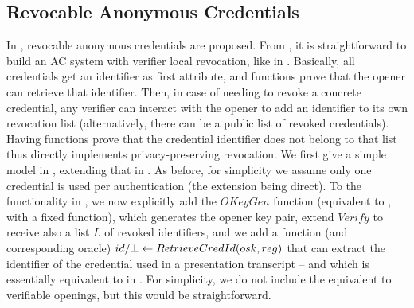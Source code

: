 \subsection{Revocable Anonymous Credentials}
\label{sapp:related-models-rac}

In \cite{cks10}, revocable anonymous credentials are proposed. From \CUASGen, it
is straightforward to build an AC system with verifier local revocation, like in
\cite{bs04}. Basically, all credentials get an identifier as first attribute,
and \feval functions prove that the opener can retrieve that identifier. Then,
in case of needing to revoke a concrete credential, any verifier can interact
with the opener to add an identifier to its own revocation list (alternatively,
there can be a public list of revoked credentials). Having \feval functions
prove that the credential identifier does not belong to that list thus directly
implements privacy-preserving revocation. We first give a simple model in
, extending that in . As
before, for simplicity we assume only one credential is used per authentication
(the extension being direct). To the functionality in
, we now explicitly add the $OKeyGen$ function
(equivalent to \OKeyGen, with a fixed \finsp function),
which generates the opener key pair, extend $Verify$ to receive also a list $L$
of revoked identifiers, and we add a function (and corresponding oracle) $id/\bot
\gets RetrieveCredId(osk,reg)$ that can extract the identifier of the
credential used in a presentation transcript \utrans -- and which is essentially
equivalent to \Open in \UAS. For simplicity, we do not include the equivalent to
verifiable openings, but this would be straightforward.

